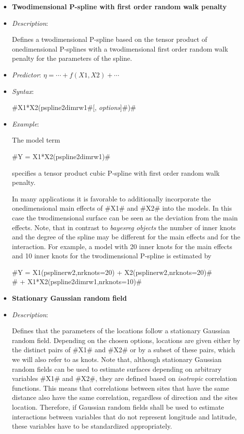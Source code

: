 \begin{itemize}
\item[]{\bf\sffamily Twodimensional P-spline with first order
random walk penalty}

\item[] {\em Description}:

Defines a twodimensional P-spline based on the tensor product of
onedimensional P-splines with a twodimensional first order random
walk penalty for the parameters of the spline.
\item[] {\em Predictor}: $\eta= \cdots + f(X1,X2) + \cdots$
\item[] {\em Syntax}:

#X1*X2(pspline2dimrw1#[, {\em options}]#)#
\item[] {\em Example}:

The model term

#Y = X1*X2(pspline2dimrw1)#

specifies a tensor product cubic P-spline with first order random
walk penalty.

In many applications it is favorable to additionally incorporate the
onedimensional main effects of #X1# and #X2# into the models. In
this case the twodimensional surface can be seen as the deviation
from the main effects. Note, that in contrast to {\em bayesreg
objects} the number of inner knots and the degree of the spline may
be different for the main effects and for the interaction. For
example, a model with 20 inner knots for the main effects and 10
inner knots for the twodimensional P-spline is estimated by

 #Y = X1(psplinerw2,nrknots=20) + X2(psplinerw2,nrknots=20)#\\
 #    + X1*X2(pspline2dimrw1,nrknots=10)#

\item[]{\bf\sffamily Stationary Gaussian random field}

\item[] {\em Description}:

Defines that the parameters of the locations follow a stationary
Gaussian random field. Depending on the chosen options, locations
are given either by the distinct pairs of #X1# and #X2# or by a
subset of these pairs, which we will also refer to as knots. Note
that, although stationary Gaussian random fields can be used to
estimate surfaces depending on arbitrary variables #X1# and #X2#,
they are defined based on {\em isotropic} correlation functions.
This means that correlations between sites that have the same
distance also have the same correlation, regardless of direction
and the sites location. Therefore, if Gaussian random fields shall
be used to estimate interactions between variables that do not
represent longitude and latitude, these variables have to be
standardized appropriately.


\end{itemize}
